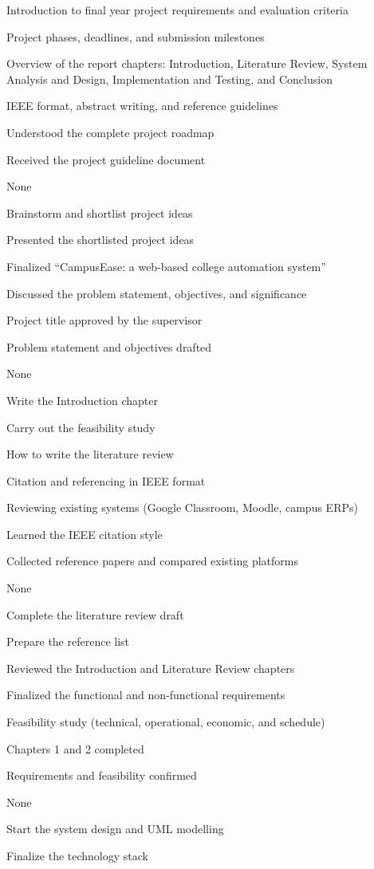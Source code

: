 \documentclass[12pt,a4paper]{report}
\begin{document}
{\item Introduction to final year project requirements and evaluation criteria
 \item Project phases, deadlines, and submission milestones
 \item Overview of the report chapters: Introduction, Literature Review, System Analysis and Design, Implementation and Testing, and Conclusion
 \item IEEE format, abstract writing, and reference guidelines}
{\item Understood the complete project roadmap
 \item Received the project guideline document}
{\item None}
{\item Brainstorm and shortlist project ideas}

{\item Presented the shortlisted project ideas
 \item Finalized ``CampusEase: a web-based college automation system''
 \item Discussed the problem statement, objectives, and significance}
{\item Project title approved by the supervisor
 \item Problem statement and objectives drafted}
{\item None}
{\item Write the Introduction chapter
 \item Carry out the feasibility study}

{\item How to write the literature review
 \item Citation and referencing in IEEE format
 \item Reviewing existing systems (Google Classroom, Moodle, campus ERPs)}
{\item Learned the IEEE citation style
 \item Collected reference papers and compared existing platforms}
{\item None}
{\item Complete the literature review draft
 \item Prepare the reference list}

{\item Reviewed the Introduction and Literature Review chapters
 \item Finalized the functional and non-functional requirements
 \item Feasibility study (technical, operational, economic, and schedule)}
{\item Chapters 1 and 2 completed
 \item Requirements and feasibility confirmed}
{\item None}
{\item Start the system design and UML modelling
 \item Finalize the technology stack}
\end{document}
